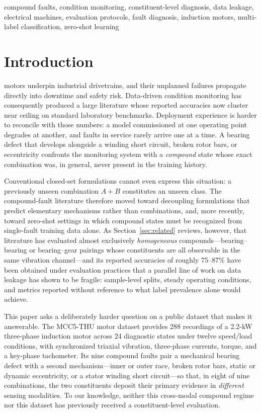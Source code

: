 \begin{IEEEkeywords}
compound faults, condition monitoring, constituent-level diagnosis, data
leakage, electrical machines, evaluation protocols, fault diagnosis,
induction motors, multi-label classification, zero-shot learning
\end{IEEEkeywords}

\section{Introduction}
\label{sec:intro}

 motors underpin industrial drivetrains, and their
unplanned failures propagate directly into downtime and safety risk.
Data-driven condition monitoring has consequently produced a large literature
whose reported accuracies now cluster near ceiling on standard laboratory
benchmarks. Deployment experience is harder to reconcile with those numbers:
a model commissioned at one operating point degrades at another, and faults
in service rarely arrive one at a time. A bearing defect that develops
alongside a winding short circuit, broken rotor bars, or eccentricity
confronts the monitoring system with a \emph{compound} state whose exact
combination was, in general, never present in the training history.

Conventional closed-set formulations cannot even express this situation: a
previously unseen combination $A{+}B$ constitutes an unseen class. The
compound-fault literature therefore moved toward decoupling formulations that
predict elementary mechanisms rather than combinations, and, more recently,
toward zero-shot settings in which compound states must be recognized from
single-fault training data alone. As Section~\ref{sec:related} reviews,
however, that literature has evaluated almost exclusively \emph{homogeneous}
compounds---bearing--bearing or bearing--gear pairings whose constituents are
all observable in the same vibration channel---and its reported accuracies of
roughly 75--87\% have been obtained under evaluation practices that a
parallel line of work on data leakage has shown to be fragile: sample-level
splits, steady operating conditions, and metrics reported without reference
to what label prevalence alone would achieve.

This paper asks a deliberately harder question on a public dataset that makes
it answerable. The MCC5-THU motor dataset \cite{chen2026} provides 288
recordings of a 2.2-kW three-phase induction motor across 24 diagnostic
states under twelve speed/load conditions, with synchronized triaxial
vibration, three-phase currents, torque, and a key-phase tachometer. Its nine
compound faults pair a mechanical bearing defect with a second
mechanism---inner or outer race, broken rotor bars, static or dynamic
eccentricity, or a stator winding short circuit---so that, in eight of nine
combinations, the two constituents deposit their primary evidence in
\emph{different} sensing modalities. To our knowledge, neither this
cross-modal compound regime nor this dataset has previously received a
constituent-level evaluation.

